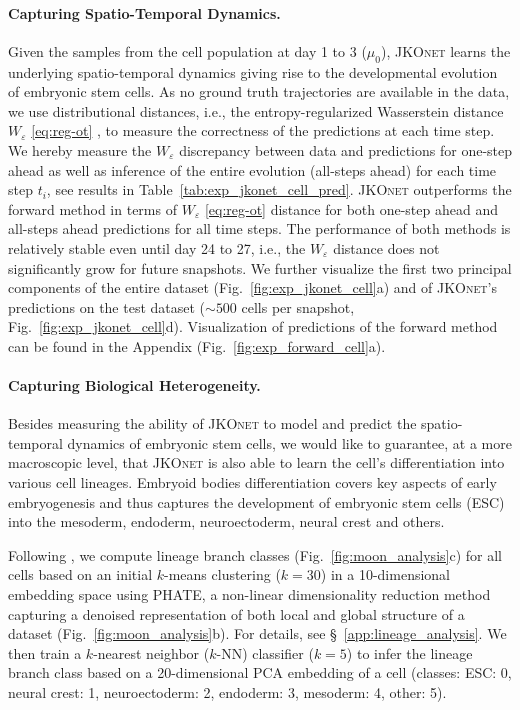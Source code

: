 \paragraph{Capturing Spatio-Temporal Dynamics.}
Given the samples from the cell population at day 1 to 3 ($\mu_0$), \textsc{JKOnet} learns the underlying spatio-temporal dynamics giving rise to the developmental evolution of embryonic stem cells. 
As no ground truth trajectories are available in the data, we use distributional distances, i.e., the entropy-regularized Wasserstein distance $W_\varepsilon$ \eqref{eq:reg-ot} \citep{flamary2021pot}, to measure the correctness of the predictions at each time step.
We hereby measure the $W_\varepsilon$ discrepancy between data and predictions for one-step ahead as well as inference of the entire evolution (all-steps ahead) for each time step $t_i$, see results in Table~\ref{tab:exp_jkonet_cell_pred}. \textsc{JKOnet} outperforms the forward method in terms of $W_\varepsilon$ \eqref{eq:reg-ot} distance for both one-step ahead and all-steps ahead predictions for all time steps. 
The performance of both methods is relatively stable even until day 24 to 27, i.e., the $W_\varepsilon$ distance does not significantly grow for future snapshots.
We further visualize the first two principal components of the entire dataset (Fig.~\ref{fig:exp_jkonet_cell}a) and of \textsc{JKOnet}'s predictions on the test dataset ($\sim 500$ cells per snapshot, Fig.~\ref{fig:exp_jkonet_cell}d). Visualization of predictions of the forward method can be found in the Appendix (Fig.~\ref{fig:exp_forward_cell}a). 

\paragraph{Capturing Biological Heterogeneity.}
Besides measuring the ability of \textsc{JKOnet} to model and predict the spatio-temporal dynamics of embryonic stem cells, we would like to guarantee, at a more macroscopic level, that \textsc{JKOnet} is also able to learn the cell's differentiation into various cell lineages.
Embryoid bodies differentiation covers key aspects of early embryogenesis and thus captures the development of embryonic stem cells (ESC) into the mesoderm, endoderm, neuroectoderm, neural crest and others.

Following \citet[Fig. 6, Suppl. Note 4]{moon2019}, we compute lineage branch classes (Fig.~\ref{fig:moon_analysis}c) for all cells based on an initial $k$-means clustering ($k=30$) in a 10-dimensional embedding space using PHATE, a non-linear dimensionality reduction method capturing a denoised representation of both local and global structure of a dataset (Fig.~\ref{fig:moon_analysis}b).
For details, see \S~\ref{app:lineage_analysis}.
We then train a $k$-nearest neighbor ($k$-NN) classifier ($k=5$) to infer the lineage branch class based on a 20-dimensional PCA embedding of a cell (classes: ESC: 0, neural crest: 1, neuroectoderm: 2, endoderm: 3, mesoderm: 4, other: 5).

